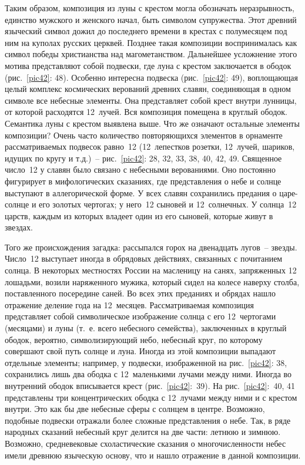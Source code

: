 \documentclass[pscyr,titlepage,chapters]{hedreport}
\begin{document}
  Таким образом, композиция из луны с крестом могла обозначать неразрывность,
  единство мужского и женского начал, быть символом супружества. Этот древний
  языческий символ дожил до последнего времени в крестах
  с полумесяцем под ним на куполах русских церквей. Позднее такая композиции
  воспринималась как символ победы христианства над магометанством. Дальнейшее
  усложнение этого мотива представляют собой подвески, где луна с крестом
  заключается в ободок (рис.~\ref{pic42}: 48). Особенно интересна подвеска
  (рис.~\ref{pic42}: 49), воплощающая целый комплекс космических верований
  древних славян, соединяющая в одном символе все небесные элементы. Она
  представляет собой крест внутри лунницы, от которой расходятся 12~лучей. Вся
  композиция помещена в круглый ободок. Семантика луны с крестом выявлена выше.
  Что же означают остальные элементы композиции? Очень часто количество
  повторяющихся элементов в орнаменте рассматриваемых подвесок равно~12
  (12~лепестков розетки, 12~лучей, шариков, идущих по кругу и т.д.)~--
  рис.~\ref{pic42}: 28, 32, 33, 38, 40, 42, 49. Священное число~12 у славян было
  связано с небесными верованиями. Оно постоянно фигурирует в мифологических
  сказаниях, где представления о небе и солнце выступают в аллегорической форме.
  У всех славян сохранились предания о царе-солнце и его золотых чертогах; у
  него~12 сыновей и 12~солнечных. У солнца~12 царств, каждым из которых владеет
  один из его сыновей, которые живут в звездах.

  Того же происхождения загадка: рассыпался горох на двенадцать лугов~-- звезды.
  Число~12 выступает иногда в обрядовых действиях, связанных с почитанием
  солнца. В некоторых местностях
  России на масленицу на санях, запряженных 12 лошадьми, возили наряженного
  мужика, который сидел на колесе наверху столба, поставленного посередине
  саней. Во всех этих преданиях и обрядах нашло отражение деление года на
  12~месяцев. Рассматриваемая композиция представляет собой символическое
  изображение солнца с его 12~чертогами (месяцами) и луны (т.~е. всего небесного
  семейства), заключенных в круглый ободок, вероятно, символизирующий небо,
  небесный круг, по которому совершают свой путь солнце и луна. Иногда из этой
  композиции выпадают отдельные элементы; например, у подвески, изображенной на
  рис.~\ref{pic42}: 38, сохранились лишь два ободка с 12~маленькими лучами между
  ними. Иногда во внутренний ободок вписывается крест (рис.~\ref{pic42}:~39).
  На рис.~\ref{pic42}:~40, 41 представлены три концентрических ободка с
  12~лучами между ними и с крестом внутри. Это как бы две небесные сферы с
  солнцем в центре. Возможно, подобные подвески отражали более сложные
  представления о небе. Так, в ряде народных сказаний небесный круг делится на
  две части: летнюю и зимнюю. Возможно, средневековые схоластические сказания о
  многочисленности небес имели древнюю языческую основу, что и нашло отражение в
  данной композиции.
\end{document}
